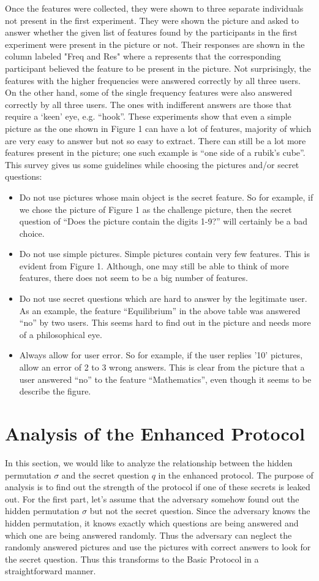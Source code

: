 \documentclass{llncs}
\newcommand{\tick}{\ding{52}}
\begin{document}
Once the features were collected, they were shown to three separate individuals not present in the first experiment. They were shown the picture and asked to answer whether the given list of features found by the participants in the first experiment were present in the picture or not. Their responses are shown in the column labeled "Freq and Res" where a \tick represents that the corresponding participant believed the feature to be present in the picture. Not surprisingly, the features with the higher frequencies were answered correctly by all three users. On the other hand, some of the single frequency features were also answered correctly by all three users. The ones with indifferent answers are those that require a `keen' eye, e.g. ``hook''.
These experiments show that even a simple picture as the one shown in Figure 1 can have a lot of features, majority of which are very easy to answer but not so easy to extract. There can still be a lot more features present in the picture; one such example is "`one side of a rubik's cube"'.
This survey gives us some guidelines while choosing the pictures and/or secret questions:
\begin{itemize}
	\item Do not use pictures whose main object is the secret feature. So for example, if we chose the picture of Figure 1 as the challenge picture, then the secret question of "`Does the picture contain the digits 1-9?"' will certainly be a bad choice.
	\item Do not use simple pictures. Simple pictures contain very few features. This is evident from Figure 1. Although, one may still be able to think of more features, there does not seem to be a big number of features.
	\item Do not use secret questions which are hard to answer by the legitimate user. As an example, the feature "`Equilibrium"' in the above table was answered "`no"' by two users. This seems hard to find out in the picture and needs more of a philosophical eye. 
	\item Always allow for user error. So for example, if the user replies '10' pictures, allow an error of 2 to 3 wrong answers. This is clear from the picture that a user answered "`no"' to the feature "`Mathematics"', even though it seems to be describe the figure. 
\end{itemize}
\section{Analysis of the Enhanced Protocol}
In this section, we would like to analyze the relationship between the hidden permutation $\sigma $ and the secret question $q$ in the enhanced protocol. The purpose of analysis is to find out the strength of the protocol if one of these secrets is leaked out. For the first part, let's assume that the adversary somehow found out the hidden permutation $\sigma$ but not the secret question. Since the adversary knows the hidden permutation, it knows exactly which questions are being answered and which one are being answered randomly. Thus the adversary can neglect the randomly answered pictures and use the pictures with correct answers to look for the secret question. Thus this transforms to the Basic Protocol in a straightforward manner.
\end{document}
